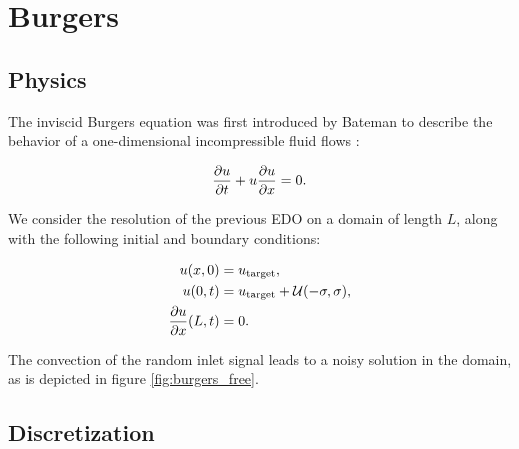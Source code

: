 \chapter{Burgers}

\section{Physics}

The inviscid Burgers equation was first introduced by Bateman to describe the behavior of a one-dimensional incompressible fluid flows \cite{bateman1915}:

\begin{equation}
\label{eq:burgers}
	\frac{\partial u}{\partial t} + u \frac{\partial u}{\partial x} = 0.
\end{equation}

We consider the resolution of the previous EDO on a domain of length $L$, along with the following initial and boundary conditions:

\begin{equation}
\label{eq:burgers_bc}
\begin{split}
	u(x,0)	&= u_\text{target}, \\
	u(0,t) 	&= u_\text{target} + \mathcal{U} ( -\sigma, \sigma), \\
	\frac{\partial u}{\partial x} (L,t) &= 0.
\end{split}
\end{equation}

The convection of the random inlet signal leads to a noisy solution in the domain, as is depicted in figure \ref{fig:burgers_free}.
 
\bigskip



\section{Discretization}


